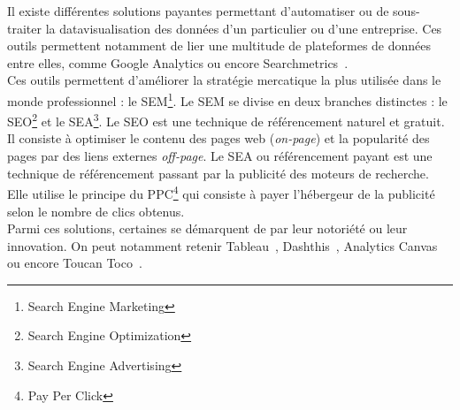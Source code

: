 Il existe différentes solutions payantes permettant d'automatiser ou de sous-traiter la datavisualisation des données d'un particulier ou d'une entreprise. Ces outils permettent notamment de lier une multitude de plateformes de données entre elles, comme Google Analytics ou encore Searchmetrics~\cite{Searchmetrics}. \\

Ces outils permettent d'améliorer la stratégie mercatique la plus utilisée dans le monde professionnel : le SEM\footnote{Search Engine Marketing}. Le SEM se divise en deux branches distinctes : le SEO\footnote{Search Engine Optimization} et le SEA\footnote{Search Engine Advertising}. Le SEO est une technique de référencement naturel et gratuit. Il consiste à optimiser le contenu des pages web (\textit{on-page}) et la popularité des pages par des liens externes \textit{off-page}. Le SEA ou référencement payant est une technique de référencement passant par la publicité des moteurs de recherche. Elle utilise le principe du PPC\footnote{Pay Per Click} qui consiste à payer l'hébergeur de la publicité selon le nombre de clics obtenus.\\

Parmi ces solutions, certaines se démarquent de par leur notoriété ou leur innovation. On peut notamment retenir Tableau~\cite{Tableau}, Dashthis~\cite{Dashthis}, Analytics Canvas~\cite{AnalyticCanvas} ou encore Toucan Toco~\cite{ToucanToco}.
